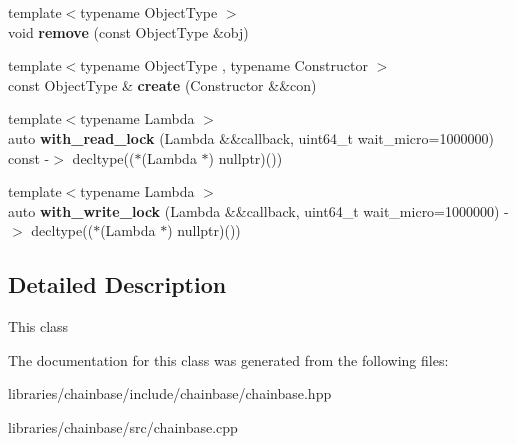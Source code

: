 \begin{DoxyCompactItemize}
\item 
\mbox{\label{classchainbase_1_1database_ac6bb29708e4fdfb6899028e3c351fe0b}} 
{\footnotesize template$<$typename Object\+Type $>$ }\\void {\bfseries remove} (const Object\+Type \&obj)
\item 
\mbox{\label{classchainbase_1_1database_a211e3d1dde836117637599db2a257d71}} 
{\footnotesize template$<$typename Object\+Type , typename Constructor $>$ }\\const Object\+Type \& {\bfseries create} (Constructor \&\&con)
\item 
\mbox{\label{classchainbase_1_1database_a083ebb5591b119ab763e5a618915314c}} 
{\footnotesize template$<$typename Lambda $>$ }\\auto {\bfseries with\+\_\+read\+\_\+lock} (Lambda \&\&callback, uint64\+\_\+t wait\+\_\+micro=1000000) const -\/$>$ decltype(($\ast$(Lambda $\ast$) nullptr)())
\item 
\mbox{\label{classchainbase_1_1database_aeb321cb2534ffa776f50b020cd6dab2d}} 
{\footnotesize template$<$typename Lambda $>$ }\\auto {\bfseries with\+\_\+write\+\_\+lock} (Lambda \&\&callback, uint64\+\_\+t wait\+\_\+micro=1000000) -\/$>$ decltype(($\ast$(Lambda $\ast$) nullptr)())
\end{DoxyCompactItemize}


\subsection{Detailed Description}
This class 

The documentation for this class was generated from the following files\+:\begin{DoxyCompactItemize}
\item 
libraries/chainbase/include/chainbase/chainbase.\+hpp\item 
libraries/chainbase/src/chainbase.\+cpp\end{DoxyCompactItemize}
